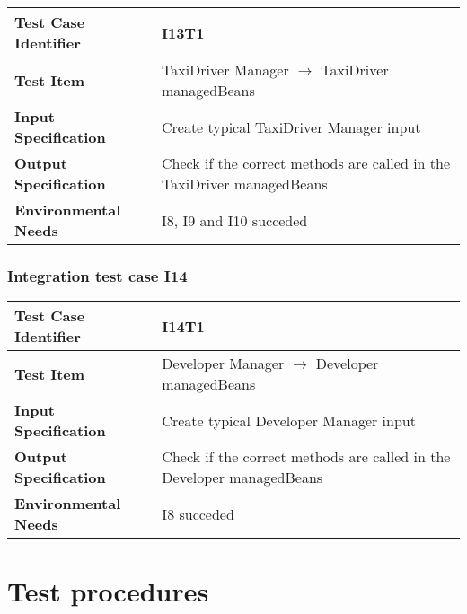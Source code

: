 \begin{table}[!htbp]
\begin{center}
\begin{tabular}[t]{p{}p{}}

\hline
\textbf{Test Case Identifier} & I13T1 \\
\hline
\textbf{Test Item} & TaxiDriver Manager $\rightarrow$ TaxiDriver managedBeans \\
\hline
\textbf{Input Specification} & Create typical TaxiDriver Manager input  \\
\hline
\textbf{Output Specification} & Check if the correct methods are called in the TaxiDriver managedBeans \\
\hline
\textbf{Environmental Needs} & I8, I9 and I10 succeded \\
\hline

\end{tabular}
\end{center}
\end{table}

\subsubsection{Integration test case I14}

\begin{table}[!htbp]
\begin{center}
\begin{tabular}[t]{p{}p{}}

\hline
\textbf{Test Case Identifier} & I14T1 \\
\hline
\textbf{Test Item} & Developer Manager $\rightarrow$ Developer managedBeans \\
\hline
\textbf{Input Specification} & Create typical Developer Manager input  \\
\hline
\textbf{Output Specification} & Check if the correct methods are called in the Developer managedBeans \\
\hline
\textbf{Environmental Needs} & I8 succeded \\
\hline

\end{tabular}
\end{center}
\end{table}
\clearpage

\section{Test procedures}

